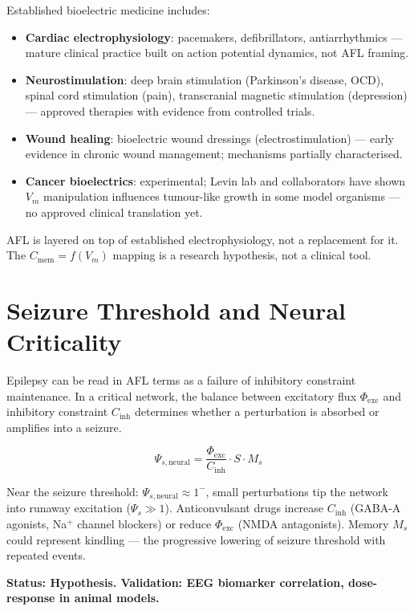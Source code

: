 \documentclass[12pt,a4paper]{article}
\begin{document}
Established bioelectric medicine includes:
\begin{itemize}
    \item \textbf{Cardiac electrophysiology}: pacemakers, defibrillators, antiarrhythmics — mature clinical practice built on action potential dynamics, not AFL framing.
    \item \textbf{Neurostimulation}: deep brain stimulation (Parkinson's disease, OCD), spinal cord stimulation (pain), transcranial magnetic stimulation (depression) — approved therapies with evidence from controlled trials.
    \item \textbf{Wound healing}: bioelectric wound dressings (electrostimulation) — early evidence in chronic wound management; mechanisms partially characterised.
    \item \textbf{Cancer bioelectrics}: experimental; Levin lab and collaborators have shown $V_m$ manipulation influences tumour-like growth in some model organisms — no approved clinical translation yet.
\end{itemize}

AFL is layered on top of established electrophysiology, not a replacement for it. The $C_{\mathrm{mem}} = f(V_m)$ mapping is a research hypothesis, not a clinical tool.

\section{Seizure Threshold and Neural Criticality}

Epilepsy can be read in AFL terms as a failure of inhibitory constraint maintenance. In a critical network, the balance between excitatory flux $\Phi_{\mathrm{exc}}$ and inhibitory constraint $C_{\mathrm{inh}}$ determines whether a perturbation is absorbed or amplifies into a seizure.

\begin{equation}
    \Psi_{s,\mathrm{neural}} = \frac{\Phi_{\mathrm{exc}}}{C_{\mathrm{inh}}} \cdot S \cdot M_s
\end{equation}

Near the seizure threshold: $\Psi_{s,\mathrm{neural}} \approx 1^-$, small perturbations tip the network into runaway excitation ($\Psi_s \gg 1$). Anticonvulsant drugs increase $C_{\mathrm{inh}}$ (GABA-A agonists, Na$^+$ channel blockers) or reduce $\Phi_{\mathrm{exc}}$ (NMDA antagonists). Memory $M_s$ could represent kindling — the progressive lowering of seizure threshold with repeated events.

\textbf{Status: Hypothesis. Validation: EEG biomarker correlation, dose-response in animal models.}
\end{document}
